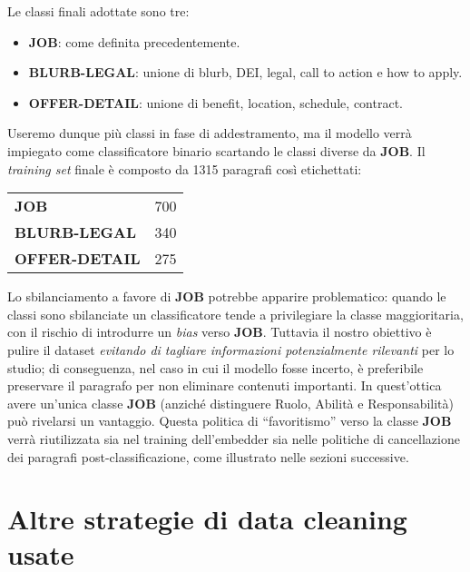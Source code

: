 \noindent Le classi finali adottate sono tre:

\begin{itemize}
    \item \textbf{JOB}: come definita precedentemente.
    \item \textbf{BLURB-LEGAL}: unione di blurb, DEI, legal, call to action e how to apply.
    \item \textbf{OFFER-DETAIL}: unione di benefit, location, schedule, contract.
\end{itemize}

\noindent Useremo dunque più classi in fase di addestramento, ma il modello verrà impiegato come classificatore binario scartando le classi diverse da \textbf{JOB}. Il \textit{training set} finale è composto da 1315 paragrafi così etichettati:

\begin{center}
\begin{tabular}{ll}
\textbf{JOB} & 700 \\
\textbf{BLURB-LEGAL} & 340 \\
\textbf{OFFER-DETAIL} & 275 \\
\end{tabular}
\end{center}

\noindent Lo sbilanciamento a favore di \textbf{JOB} potrebbe apparire problematico: quando le classi sono sbilanciate un classificatore tende a privilegiare la classe maggioritaria, con il rischio di introdurre un \textit{bias} verso \textbf{JOB}. Tuttavia il nostro obiettivo è pulire il dataset \textit{evitando di tagliare informazioni potenzialmente rilevanti} per lo studio; di conseguenza, nel caso in cui il modello fosse incerto, è preferibile preservare il paragrafo per non eliminare contenuti importanti. In quest'ottica avere un'unica classe \textbf{JOB} (anziché distinguere Ruolo, Abilità e Responsabilità) può rivelarsi un vantaggio. Questa politica di ``favoritismo'' verso la classe \textbf{JOB} verrà riutilizzata sia nel training dell'embedder sia nelle politiche di cancellazione dei paragrafi post-classificazione, come illustrato nelle sezioni successive.

\section{Altre strategie di data cleaning usate}
